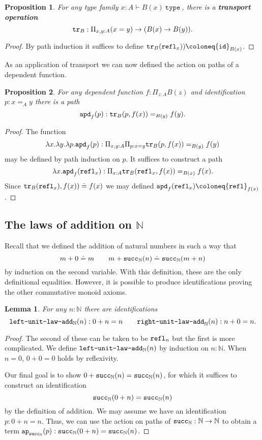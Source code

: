 \documentclass{amsart}
\theoremstyle{theorem}
\newtheorem*{lem}{Lemma}
\newtheorem*{prop}{Proposition}
\theoremstyle{definition}
\theoremstyle{remark}
\newcommand{\0}{\mathbbe{0}}
\newcommand{\1}{\mathbbe{1}}
\newcommand{\2}{\mathbbe{2}}
\newcommand{\3}{\mathbbe{3}}
\newcommand{\4}{\mathbbe{4}}
\newcommand{\univ}{{~\texttt{type}~}}
\newcommand{\term}[1]{{\textup{\texttt{#1}}}}
\newcommand{\id}{\term{id}}
\newcommand{\bN}{{\mathbb{N}}}
\newcommand{\suc}{\term{succ}_{\bN}}
\newcommand{\refl}{\term{refl}}
\newcommand{\ap}{\term{ap}}
\newcommand{\tr}{\term{tr}}
\newcommand{\apd}{\term{apd}}
\begin{document}
\begin{prop} For any type family $x : A \vdash B(x) \univ$, there is a \textbf{transport operation}
\[ \tr_B : \Pi_{x,y :A} (x=y) \to (B(x) \to B(y)).\]
\end{prop}
\begin{proof}
By path induction it suffices to define $\tr_B(\refl_x)) \coloneq \id_{B(x)}$.
\end{proof}

As an application of transport we can now defined the action on paths of a dependent function.

\begin{prop} For any dependent function $f : \Pi_{z: A} B(z)$ and identification $p : x=_A y$ there is a path
\[ \apd_f(p) : \tr_B(p, f(x)) =_{B(y)} f(y).\]
\end{prop}
\begin{proof}
The function
 \[ \lambda x . \lambda y. \lambda p. \apd_f(p) : \Pi_{x,y:A} \Pi_{p : x=y} \tr_B(p, f(x)) =_{B(y)} f(y)\]
 may be defined by path induction on $p$. It suffices to construct a path
 \[ \lambda x . \apd_f(\refl_x) : \Pi_{x :A} \tr_B(\refl_x,f(x)) =_{B(x)} f(x).\]
Since  $\tr_B(\refl_x),f(x)) \doteq f(x)$ we may defined $\apd_f(\refl_x) \coloneq \refl_{f(x)}$.
\end{proof}

\subsection*{The laws of addition on $\bN$}

Recall that we defined the addition of natural numbers in such a way that
\[ m+ 0 \doteq m \qquad m+ \suc(n) \doteq \suc(m+n)\]
by induction on the second variable. With this definition, these are the only definitional equalities. However, it is possible to produce identifications proving the other commutative monoid axioms.

\begin{lem} For any $n : \bN$ there are identifications
\[\term{left-unit-law-add}_\bN(n) : 0 + n = n \qquad \term{right-unit-law-add}_\bN(n) : n+0=n.\]
\end{lem}
\begin{proof}
The second of these can be taken to be $\refl_n$ but the first is more complicated. We define $\term{left-unit-law-add}_\bN(n)$ by induction on $n : \bN$. When $n = 0$, $0+0=0$ holds by reflexivity. 

Our final goal is to show $0+\suc(n) = \suc(n)$, for which it suffices to construct an identification \[ \suc(0+n) = \suc(n)\]
by the definition of addition. We may assume we have an identification $p : 0 + n = n$. Thus, we can use the action on paths of $\suc : \bN \to \bN$  to obtain a term $\ap_{\suc}(p) : \suc(0+n) = \suc(n)$.
\end{proof}
\end{document}
